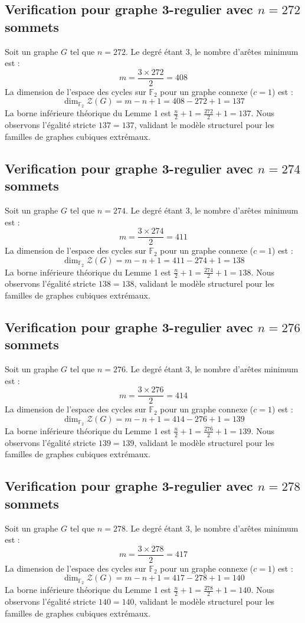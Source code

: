 \documentclass[11pt,a4paper]{article}
\begin{document}
\subsection{Verification pour graphe 3-regulier avec $n=272$ sommets}
Soit un graphe $G$ tel que $n = 272$. Le degré étant 3, le nombre d'arêtes minimum est :
$$ m = \frac{3 \times 272}{2} = 408 $$
La dimension de l'espace des cycles sur $\mathbb{F}_2$ pour un graphe connexe ($c=1$) est :
$$ \dim_{\mathbb{F}_2} \mathcal{Z}(G) = m - n + 1 = 408 - 272 + 1 = 137 $$
La borne inférieure théorique du Lemme 1 est $\frac{n}{2} + 1 = \frac{272}{2} + 1 = 137$.
Nous observons l'égalité stricte $137 = 137$, validant le modèle structurel pour les familles de graphes cubiques extrémaux.

\subsection{Verification pour graphe 3-regulier avec $n=274$ sommets}
Soit un graphe $G$ tel que $n = 274$. Le degré étant 3, le nombre d'arêtes minimum est :
$$ m = \frac{3 \times 274}{2} = 411 $$
La dimension de l'espace des cycles sur $\mathbb{F}_2$ pour un graphe connexe ($c=1$) est :
$$ \dim_{\mathbb{F}_2} \mathcal{Z}(G) = m - n + 1 = 411 - 274 + 1 = 138 $$
La borne inférieure théorique du Lemme 1 est $\frac{n}{2} + 1 = \frac{274}{2} + 1 = 138$.
Nous observons l'égalité stricte $138 = 138$, validant le modèle structurel pour les familles de graphes cubiques extrémaux.

\subsection{Verification pour graphe 3-regulier avec $n=276$ sommets}
Soit un graphe $G$ tel que $n = 276$. Le degré étant 3, le nombre d'arêtes minimum est :
$$ m = \frac{3 \times 276}{2} = 414 $$
La dimension de l'espace des cycles sur $\mathbb{F}_2$ pour un graphe connexe ($c=1$) est :
$$ \dim_{\mathbb{F}_2} \mathcal{Z}(G) = m - n + 1 = 414 - 276 + 1 = 139 $$
La borne inférieure théorique du Lemme 1 est $\frac{n}{2} + 1 = \frac{276}{2} + 1 = 139$.
Nous observons l'égalité stricte $139 = 139$, validant le modèle structurel pour les familles de graphes cubiques extrémaux.

\subsection{Verification pour graphe 3-regulier avec $n=278$ sommets}
Soit un graphe $G$ tel que $n = 278$. Le degré étant 3, le nombre d'arêtes minimum est :
$$ m = \frac{3 \times 278}{2} = 417 $$
La dimension de l'espace des cycles sur $\mathbb{F}_2$ pour un graphe connexe ($c=1$) est :
$$ \dim_{\mathbb{F}_2} \mathcal{Z}(G) = m - n + 1 = 417 - 278 + 1 = 140 $$
La borne inférieure théorique du Lemme 1 est $\frac{n}{2} + 1 = \frac{278}{2} + 1 = 140$.
Nous observons l'égalité stricte $140 = 140$, validant le modèle structurel pour les familles de graphes cubiques extrémaux.
\end{document}
